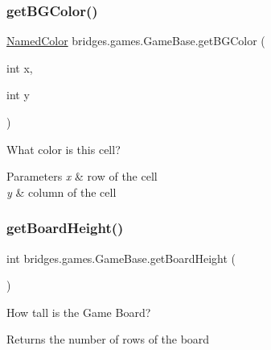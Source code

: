\subsubsection{\texorpdfstring{getBGColor()}{getBGColor()}}
{\footnotesize\ttfamily \mbox{\hyperlink{enumbridges_1_1base_1_1_named_color}{Named\+Color}} bridges.\+games.\+Game\+Base.\+get\+B\+G\+Color (\begin{DoxyParamCaption}\item[{int}]{x,  }\item[{int}]{y }\end{DoxyParamCaption})\hspace{0.3cm}{\ttfamily [protected]}}



What color is this cell? 


\begin{DoxyParams}{Parameters}
{\em x} & row of the cell \\
\hline
{\em y} & column of the cell \\
\hline
\end{DoxyParams}
\mbox{\label{classbridges_1_1games_1_1_game_base_a1effb2a789eb19eb81dec64f25be233e}} 
\subsubsection{\texorpdfstring{getBoardHeight()}{getBoardHeight()}}
{\footnotesize\ttfamily int bridges.\+games.\+Game\+Base.\+get\+Board\+Height (\begin{DoxyParamCaption}{ }\end{DoxyParamCaption})\hspace{0.3cm}{\ttfamily [protected]}}



How tall is the Game Board? 

\begin{DoxyReturn}{Returns}
the number of rows of the board 
\end{DoxyReturn}
\mbox{\label{classbridges_1_1games_1_1_game_base_a33018840a6f19eb54ef27e55231871f5}} 
